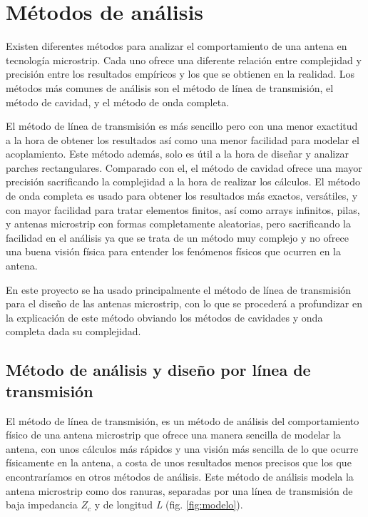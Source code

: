 \section{Métodos de análisis}
\label{analisis}
\par Existen diferentes métodos para analizar el comportamiento de una antena en tecnología microstrip. Cada uno ofrece una diferente relación entre complejidad y precisión entre los resultados empíricos y los que se obtienen en la realidad. Los métodos más comunes de análisis son el método  de línea de transmisión, el método de cavidad, y el método de onda completa. 
\\
\par El método de línea de transmisión es más sencillo pero con una menor exactitud a la hora de obtener los resultados así como una menor facilidad para modelar el acoplamiento. Este método además, solo es útil a la hora de diseñar y analizar parches rectangulares. Comparado con el, el método de cavidad ofrece una mayor precisión sacrificando la complejidad a la hora de realizar los cálculos. El método de onda completa es usado para obtener los resultados más exactos, versátiles, y con mayor facilidad para tratar elementos finitos, así como arrays infinitos, pilas, y antenas microstrip con formas completamente aleatorias, pero sacrificando la facilidad en el análisis ya que se trata de un método muy complejo y no ofrece una buena visión física para entender los fenómenos físicos que ocurren en la antena. 
\\
\par En este proyecto se ha usado principalmente el método de línea de transmisión para el diseño de las antenas microstrip, con lo que se procederá a profundizar en la explicación de este método obviando los métodos de cavidades y onda completa dada su complejidad. \cite{Balanis2015}

\subsection{Método de análisis y diseño por línea de transmisión}
\label{351}
\par El método de línea de transmisión, es un método de análisis del comportamiento físico de una antena microstrip que ofrece una manera sencilla de modelar la antena, con unos cálculos más rápidos y una visión más sencilla de lo que ocurre físicamente en la antena, a costa de unos resultados menos precisos que los que encontraríamos en otros métodos de análisis. Este método de análisis modela la antena microstrip como dos ranuras, separadas por una línea de transmisión de baja impedancia $Z_{c}$ y de longitud \textit{L} (fig. \ref{fig:modelo}). 
\\


